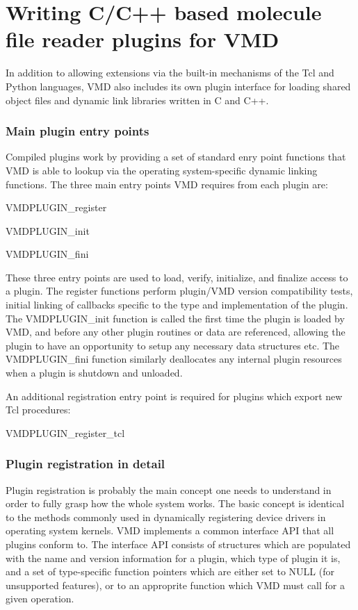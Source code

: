\section{Writing C/C++ based molecule file reader plugins for VMD}\label{molfileplugins}


In addition to allowing extensions via the built-in mechanisms of the Tcl and Python languages, VMD also includes its own plugin interface for loading shared object files and dynamic link libraries written in C and C++.



 \subsubsection*{Main plugin entry points}
 Compiled plugins work by providing a set of standard enry point functions that VMD is able to lookup via the operating system-specific dynamic linking functions. The three main entry points VMD requires from each plugin are:  \begin{CompactItemize}
\item 
VMDPLUGIN\_\-register \item 
VMDPLUGIN\_\-init \item 
VMDPLUGIN\_\-fini \end{CompactItemize}
These three entry points are used to load, verify, initialize, and finalize access to a plugin. The register functions perform  plugin/VMD version compatibility tests, initial linking of  callbacks specific to the type and implementation of the plugin. The VMDPLUGIN\_\-init function is called the first time the plugin is  loaded by VMD, and before any other plugin routines or data are referenced, allowing the plugin to have an opportunity to setup any necessary data  structures etc. The VMDPLUGIN\_\-fini function similarly deallocates any internal plugin resources when a plugin is shutdown and unloaded.

An additional registration entry point is required for plugins which  export new Tcl procedures: \begin{CompactItemize}
\item 
VMDPLUGIN\_\-register\_\-tcl \end{CompactItemize}


 \subsubsection*{Plugin registration in detail}
 Plugin registration is probably the main concept one needs to understand in order to fully grasp how the whole system works. The basic concept is identical to the methods commonly used in dynamically registering device drivers in operating system kernels. VMD implements a common interface API  that all plugins conform to. The interface API consists of structures which are populated with the name and version information for a plugin, which type of plugin it is, and a set of type-specific function pointers which are either set to NULL (for unsupported features), or to an approprite function which  VMD must call for a given operation.




